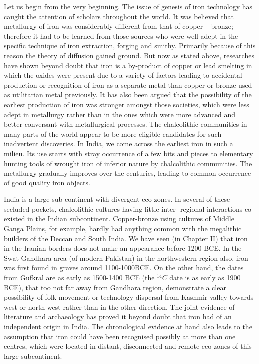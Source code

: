 Let us begin from the very beginning. The issue of genesis of iron technology has caught the attention of scholars throughout the world. It was believed that metallurgy of iron was considerably different from that of copper – bronze; therefore it had to be learned from those sources who were well adept in the specific technique of iron extraction, forging and smithy. Primarily because of this reason the theory of diffusion gained ground. But now as stated above, researches have shown beyond doubt that iron is a by-product of copper or lead smelting in which the oxides were present due to a variety of factors leading to accidental production or recognition of iron as a separate metal than copper or bronze used as utilitarian metal previously. It has also been argued that the possibility of the earliest production of iron was stronger amongst those societies, which were less adept in metallurgy rather than in the ones which were more advanced and better conversant with metallurgical processes. The chalcolithic communities in many parts of the world appear to be more eligible candidates for such inadvertent discoveries. In India, we come across the earliest iron in such a milieu. Its use starts with stray occurrence of a few bits and pieces to elementary hunting tools of wrought iron of inferior nature by chalcolithic communities. The metallurgy gradually improves over the centuries, leading to common occurrence of good quality iron objects. 

India is a large sub-continent with divergent eco-zones. In several of these secluded pockets, chalcolithic cultures having little inter- regional interactions co-existed in the Indian subcontinent. Copper-bronze using cultures of Middle Ganga Plains, for example, hardly had anything common with the megalithic builders of the Deccan and South India. We have seen (in Chapter II) that iron in the Iranian borders does not make an appearance before 1200 BCE. In the Swat-Gandhara area (of modern Pakistan) in the northwestern region also, iron was first found in graves around 1100-1000BCE. On the other hand, the dates from Gufkral are as early as 1500-1400 BCE (the ${}^{14}C$ date is as early as 1900 BCE), that too not far away from Gandhara region, demonstrate a clear possibility of folk movement or technology dispersal from Kashmir valley towards west or north-west rather than in the other direction. The joint evidence of literature and archaeology has proved it beyond doubt that iron had of an independent origin in India. The chronological evidence at hand also leads to the assumption that iron could have been recognised possibly at more than one centres, which were located in distant, disconnected and remote eco-zones of this large subcontinent. 

